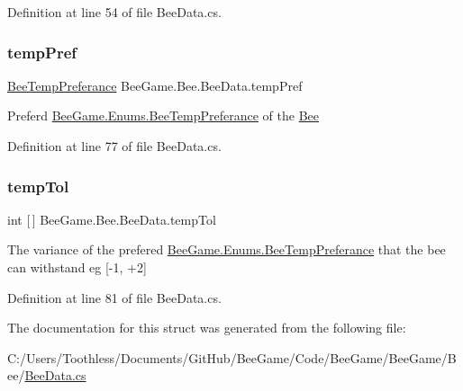 Definition at line 54 of file Bee\+Data.\+cs.

\mbox{\label{struct_bee_game_1_1_bee_1_1_bee_data_ab7c3b5184d04319359a7f31fa0a4dc8c}} 
\subsubsection{\texorpdfstring{temp\+Pref}{tempPref}}
{\footnotesize\ttfamily \hyperlink{namespace_bee_game_1_1_enums_a9db0f9ac859fab168654d657f248b024}{Bee\+Temp\+Preferance} Bee\+Game.\+Bee.\+Bee\+Data.\+temp\+Pref}



Preferd \hyperlink{namespace_bee_game_1_1_enums_a9db0f9ac859fab168654d657f248b024}{Bee\+Game.\+Enums.\+Bee\+Temp\+Preferance} of the \hyperlink{namespace_bee_game_1_1_bee}{Bee} 



Definition at line 77 of file Bee\+Data.\+cs.

\mbox{\label{struct_bee_game_1_1_bee_1_1_bee_data_aa333655c6249bb86cba999dcdf45c614}} 
\subsubsection{\texorpdfstring{temp\+Tol}{tempTol}}
{\footnotesize\ttfamily int \mbox{[}$\,$\mbox{]} Bee\+Game.\+Bee.\+Bee\+Data.\+temp\+Tol}



The variance of the prefered \hyperlink{namespace_bee_game_1_1_enums_a9db0f9ac859fab168654d657f248b024}{Bee\+Game.\+Enums.\+Bee\+Temp\+Preferance} that the bee can withstand eg \mbox{[}-\/1, +2\mbox{]} 



Definition at line 81 of file Bee\+Data.\+cs.



The documentation for this struct was generated from the following file\+:\begin{DoxyCompactItemize}
\item 
C\+:/\+Users/\+Toothless/\+Documents/\+Git\+Hub/\+Bee\+Game/\+Code/\+Bee\+Game/\+Bee\+Game/\+Bee/\hyperlink{_bee_data_8cs}{Bee\+Data.\+cs}\end{DoxyCompactItemize}

